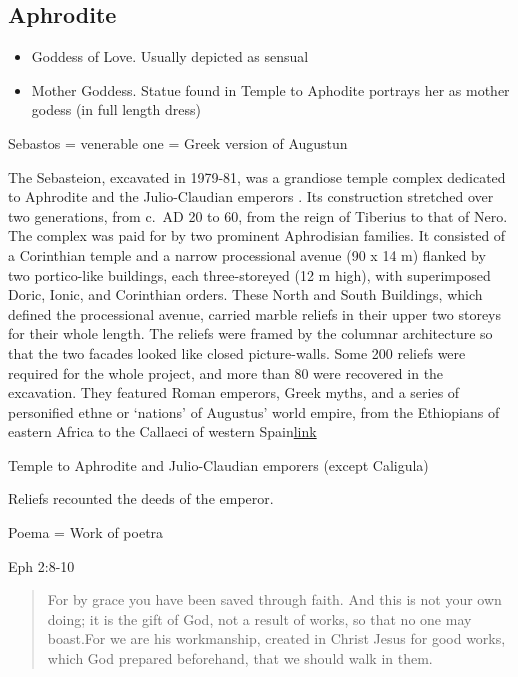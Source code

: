 \documentclass[
]{book}
\begin{document}
\hypertarget{aphrodite}{%
\subsection{Aphrodite}\label{aphrodite}}

\begin{itemize}
\item
  Goddess of Love. Usually depicted as sensual
\item
  Mother Goddess. Statue found in Temple to Aphodite portrays her as mother godess (in full length dress)
\end{itemize}

Sebastos = venerable one = Greek version of Augustun

The Sebasteion, excavated in 1979-81, was a grandiose temple complex dedicated to Aphrodite and the Julio-Claudian emperors . Its construction stretched over two generations, from c.~AD 20 to 60, from the reign of Tiberius to that of Nero. The complex was paid for by two prominent Aphrodisian families. It consisted of a Corinthian temple and a narrow processional avenue (90 x 14 m) flanked by two portico-like buildings, each three-storeyed (12 m high), with superimposed Doric, Ionic, and Corinthian orders. These North and South Buildings, which defined the processional avenue, carried marble reliefs in their upper two storeys for their whole length. The reliefs were framed by the columnar architecture so that the two facades looked like closed picture-walls. Some 200 reliefs were required for the whole project, and more than 80 were recovered in the excavation. They featured Roman emperors, Greek myths, and a series of personified ethne or `nations' of Augustus' world empire, from the Ethiopians of eastern Africa to the Callaeci of western Spain\href{http://aphrodisias.classics.ox.ac.uk/sebasteion.html}{link}

Temple to Aphrodite and Julio-Claudian emporers (except Caligula)

Reliefs recounted the deeds of the emperor.

Poema = Work of poetra

Eph 2:8-10

\begin{quote}
For by grace you have been saved through faith. And this is not your own doing; it is the gift of God, not a result of works, so that no one may boast.For we are his workmanship, created in Christ Jesus for good works, which God prepared beforehand, that we should walk in them.
\end{quote}
\end{document}
